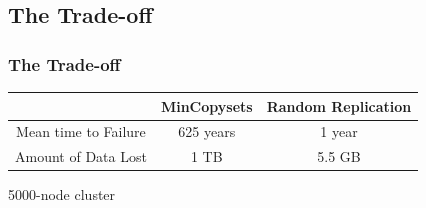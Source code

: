 \documentclass[xcolor=table]{beamer}
\begin{document}
	\subsection{The Trade-off}
	\begin{frame}
		\frametitle{The Trade-off}
		\begin{table}[h]
			\begin{tabular}{|c|c|c|}
				\hline
				\rowcolor[HTML]{3B9CF0} 
					& MinCopysets & Random Replication \\ \hline
				\rowcolor[HTML]{00D2CB} 
				Mean time to Failure & 625 years   & 1 year             \\ \hline
				\rowcolor[HTML]{00D2CB} 
				Amount of Data Lost  & 1 TB        & 5.5 GB             \\ \hline
			\end{tabular}
		\end{table}
		\begin{center}
			5000-node cluster
		\end{center}
	\end{frame}
\end{document}
